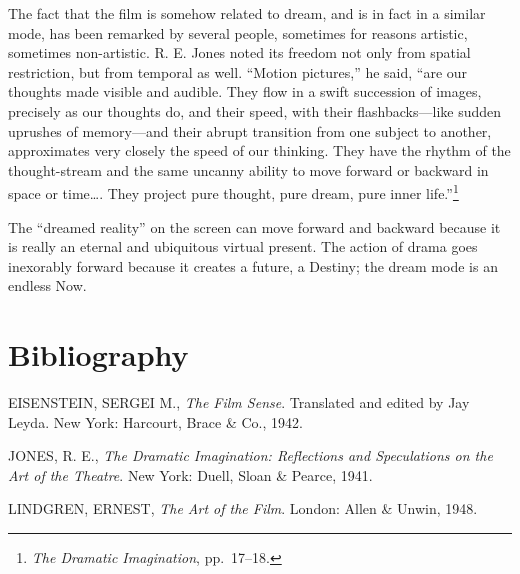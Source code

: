 \documentclass{tufte-handout}
\begin{document}
The fact that the film is somehow related to dream, and is in fact in a
similar mode, has been remarked by several people, sometimes for reasons
artistic, sometimes non-artistic. R. E. Jones noted its freedom not only
from spatial restriction, but from temporal as well. ``Motion
pic­tures,'' he said, ``are our thoughts made visible and audible. They
flow in a swift succession of images, precisely as our thoughts do, and
their speed, with their flashbacks---like sudden uprushes of
memory---and their abrupt transition from one subject to another,
approximates very closely the speed of our thinking. They have the
rhythm of the thought-stream and the same uncanny ability to move
forward or backward in space or time\ldots. They project pure thought,
pure dream, pure inner life.''\footnote{\emph{The Dramatic Imagination},
  pp.~17--18.}

The ``dreamed reality'' on the screen can move forward and backward
because it is really an eternal and ubiquitous virtual present. The
action of drama goes inexorably forward because it creates a future, a
Destiny; the dream mode is an endless Now.




\section{Bibliography}\label{bibliography}

\begin{hangparas}{.25in}{1} 



EISENSTEIN, SERGEI M., \emph{The Film Sense}. Translated and edited by
Jay Leyda. New York: Harcourt, Brace \& Co., 1942.

JONES, R. E., \emph{The Dramatic Imagination: Reflections and
Speculations on the Art of the Theatre}. New York: Duell, Sloan \&
Pearce, 1941.

LINDGREN, ERNEST, \emph{The Art of the Film}. London: Allen \& Unwin,
1948.



\end{hangparas}
\end{document}
